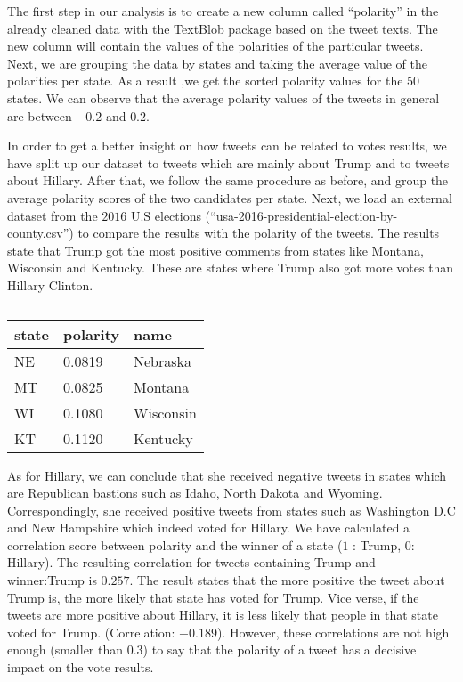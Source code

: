 \documentclass{article}
\begin{document}
  The first step in our analysis is to create a new column called
  “polarity” in the already cleaned data with the TextBlob package
  based on the tweet texts. The new column will contain the values of
  the polarities of the particular tweets. Next, we are grouping the
  data by states and taking the average value of the polarities per
  state. As a result ,we get the sorted polarity values for the 50
  states. We can observe that the average polarity values of the
  tweets in general are between $-0.2$ and $0.2$.

  In order to get a better insight on how tweets can be related to
  votes results, we have split up our dataset to tweets which are
  mainly about Trump and to tweets about Hillary. After that, we
  follow the same procedure as before, and group the average polarity
  scores of the two candidates per state. Next, we load an external
  dataset from the $2016$ U.S elections
  (“usa-2016-presidential-election-by-county.csv”) to compare the
  results with the polarity of the tweets. The results state that
  Trump got the most positive comments from states like Montana,
  Wisconsin and Kentucky. These are states where Trump also got more
  votes than Hillary Clinton.  
  
  \begin{table}[H]
    \centering
    \begin{tabular}{||p{2cm} p{3cm} p{3cm} ||}
      \hline
      state & polarity & name \\ \hline
      NE & 0.0819 & Nebraska \\
      MT & 0.0825 & Montana \\
      WI & 0.1080 & Wisconsin \\
      KT & 0.1120 & Kentucky \\
      \hline
    \end{tabular}
    \caption{\label{tab:} }
  \end{table}

  As for Hillary, we can conclude that she received negative tweets in
  states which are Republican bastions such as Idaho, North Dakota and
  Wyoming. Correspondingly, she received positive tweets from states
  such as Washington D.C and New Hampshire which indeed voted for
  Hillary. We have calculated a correlation score between polarity and
  the winner of a state ($1$ : Trump, $0$: Hillary). The resulting
  correlation for tweets containing Trump and winner:Trump  is
  $0.257$. The result states that the more positive the tweet about
  Trump is, the more likely that state has voted for Trump. Vice
  verse, if the tweets are more positive about Hillary, it is less
  likely that people in that state voted for Trump. (Correlation:
  $-0.189$). However, these correlations are not high enough (smaller
  than $0.3$) to say that the polarity of a tweet has a decisive impact
  on the vote results.
\end{document}
